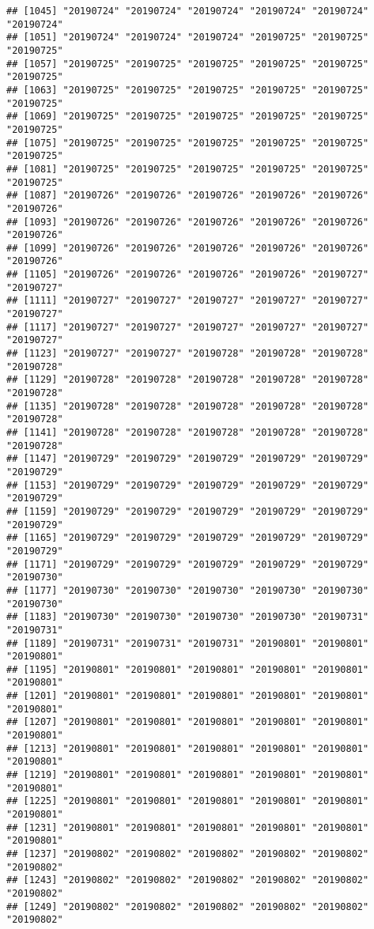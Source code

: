 \documentclass[]{article}
\begin{document}
\begin{verbatim}
## [1045] "20190724" "20190724" "20190724" "20190724" "20190724" "20190724"
## [1051] "20190724" "20190724" "20190724" "20190725" "20190725" "20190725"
## [1057] "20190725" "20190725" "20190725" "20190725" "20190725" "20190725"
## [1063] "20190725" "20190725" "20190725" "20190725" "20190725" "20190725"
## [1069] "20190725" "20190725" "20190725" "20190725" "20190725" "20190725"
## [1075] "20190725" "20190725" "20190725" "20190725" "20190725" "20190725"
## [1081] "20190725" "20190725" "20190725" "20190725" "20190725" "20190725"
## [1087] "20190726" "20190726" "20190726" "20190726" "20190726" "20190726"
## [1093] "20190726" "20190726" "20190726" "20190726" "20190726" "20190726"
## [1099] "20190726" "20190726" "20190726" "20190726" "20190726" "20190726"
## [1105] "20190726" "20190726" "20190726" "20190726" "20190727" "20190727"
## [1111] "20190727" "20190727" "20190727" "20190727" "20190727" "20190727"
## [1117] "20190727" "20190727" "20190727" "20190727" "20190727" "20190727"
## [1123] "20190727" "20190727" "20190728" "20190728" "20190728" "20190728"
## [1129] "20190728" "20190728" "20190728" "20190728" "20190728" "20190728"
## [1135] "20190728" "20190728" "20190728" "20190728" "20190728" "20190728"
## [1141] "20190728" "20190728" "20190728" "20190728" "20190728" "20190728"
## [1147] "20190729" "20190729" "20190729" "20190729" "20190729" "20190729"
## [1153] "20190729" "20190729" "20190729" "20190729" "20190729" "20190729"
## [1159] "20190729" "20190729" "20190729" "20190729" "20190729" "20190729"
## [1165] "20190729" "20190729" "20190729" "20190729" "20190729" "20190729"
## [1171] "20190729" "20190729" "20190729" "20190729" "20190729" "20190730"
## [1177] "20190730" "20190730" "20190730" "20190730" "20190730" "20190730"
## [1183] "20190730" "20190730" "20190730" "20190730" "20190731" "20190731"
## [1189] "20190731" "20190731" "20190731" "20190801" "20190801" "20190801"
## [1195] "20190801" "20190801" "20190801" "20190801" "20190801" "20190801"
## [1201] "20190801" "20190801" "20190801" "20190801" "20190801" "20190801"
## [1207] "20190801" "20190801" "20190801" "20190801" "20190801" "20190801"
## [1213] "20190801" "20190801" "20190801" "20190801" "20190801" "20190801"
## [1219] "20190801" "20190801" "20190801" "20190801" "20190801" "20190801"
## [1225] "20190801" "20190801" "20190801" "20190801" "20190801" "20190801"
## [1231] "20190801" "20190801" "20190801" "20190801" "20190801" "20190801"
## [1237] "20190802" "20190802" "20190802" "20190802" "20190802" "20190802"
## [1243] "20190802" "20190802" "20190802" "20190802" "20190802" "20190802"
## [1249] "20190802" "20190802" "20190802" "20190802" "20190802" "20190802"

\end{verbatim}
\end{document}
